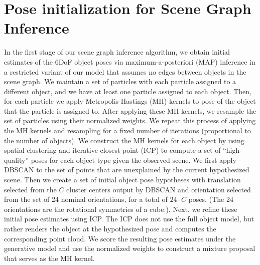 \section{Pose initialization for Scene Graph Inference}

In the first stage of our scene graph inference algorithm, we obtain initial estimates of the 6DoF object poses via maximum-a-posteriori (MAP) inference in a restricted variant of our model that assumes no edges between objects in the scene graph. 
We maintain a set of particles with each particle assigned to a different object, and we have at least one particle assigned to each object. Then, for each particle we apply Metropolis-Hastings (MH) kernels to pose of the object that the particle is assigned to. After applying these MH kernels, we resample the set of particles using their normalized weights. We repeat this process of applying the MH kernels and resampling for a fixed number of iterations (proportional to the number of objects). We construct the MH kernels for each object by using spatial clustering and iterative closest point (ICP) to compute a set of  ``high-quality'' poses for each object type given the observed scene. We first apply DBSCAN to the set of points that are unexplained by the current hypothesized scene. Then we create a set of initial object pose hypotheses with translation selected from the $C$ cluster centers output by DBSCAN and orientation selected from the set of 24 nominal orientations, for a total of $24\cdot C$ poses. (The 24 orientations are the rotational symmetries of a cube.). Next, we refine these initial pose estimates using ICP. The ICP does not use the full object model, but rather renders the object at the hypothesized pose and computes the corresponding point cloud. We score the resulting pose estimates under the generative model and use the normalized weights to construct a mixture proposal that serves as the MH kernel.

